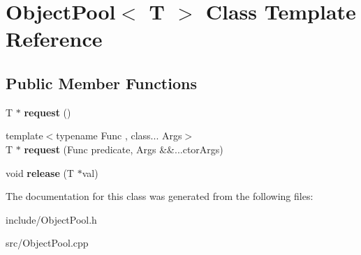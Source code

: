 \hypertarget{class_object_pool_3_01_t_01_4}{}\section{Object\+Pool$<$ T $>$ Class Template Reference}
\label{class_object_pool_3_01_t_01_4}
\subsection*{Public Member Functions}
\begin{DoxyCompactItemize}
\item 
\hypertarget{class_object_pool_3_01_t_01_4_a8530d99068b851d9b7181efd43f52cd7}{}T $\ast$ {\bfseries request} ()\label{class_object_pool_3_01_t_01_4_a8530d99068b851d9b7181efd43f52cd7}

\item 
\hypertarget{class_object_pool_3_01_t_01_4_a7d918c97fc7bc7cd64232835a6805e45}{}{\footnotesize template$<$typename Func , class... Args$>$ }\\T $\ast$ {\bfseries request} (Func predicate, Args \&\&...ctor\+Args)\label{class_object_pool_3_01_t_01_4_a7d918c97fc7bc7cd64232835a6805e45}

\item 
\hypertarget{class_object_pool_3_01_t_01_4_a604c8f69f219a8390b514814478a80b6}{}void {\bfseries release} (T $\ast$val)\label{class_object_pool_3_01_t_01_4_a604c8f69f219a8390b514814478a80b6}

\end{DoxyCompactItemize}


The documentation for this class was generated from the following files\+:\begin{DoxyCompactItemize}
\item 
include/Object\+Pool.\+h\item 
src/Object\+Pool.\+cpp\end{DoxyCompactItemize}
